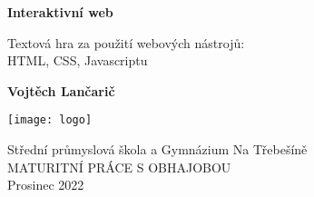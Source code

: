\begin{titlepage}
    \begin{center}
        \vspace*{1cm}
            
        \Huge
        \textbf{Interaktivní web}
            
        \vspace{0.5cm}
        \LARGE
        Textová hra za použití webových nástrojů:\\ HTML, CSS, Javascriptu
            
        \vspace{1.5cm}
            
        \textbf{Vojtěch Lančarič}
            
        \vfill
            
        \vspace{0.8cm}
            
        \texttt{[image: logo]}
            
        \Large
        Střední průmyslová škola a Gymnázium Na Třebešíně\\
	MATURITNÍ PRÁCE S OBHAJOBOU\\
        Prosinec 2022
            
    \end{center}
\end{titlepage}
